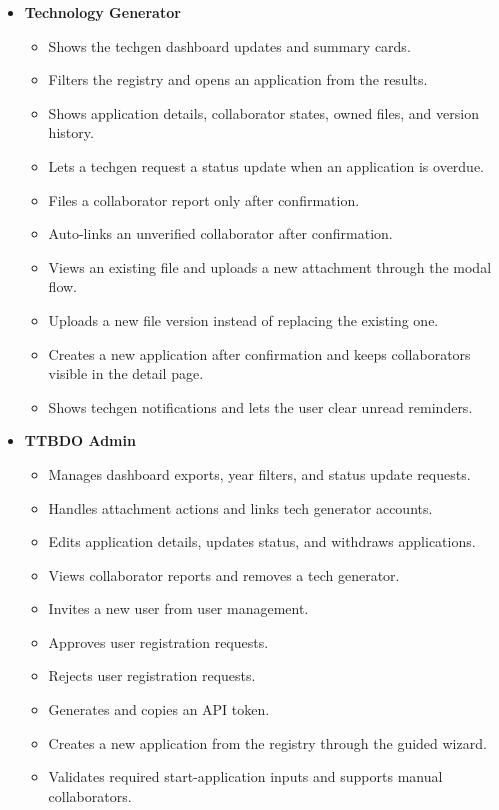 \begin{itemize}
    \item \textbf{Technology Generator}
    \begin{itemize}
        \item Shows the techgen dashboard updates and summary cards.
        \item Filters the registry and opens an application from the results.
        \item Shows application details, collaborator states, owned files, and version history.
        \item Lets a techgen request a status update when an application is overdue.
        \item Files a collaborator report only after confirmation.
        \item Auto-links an unverified collaborator after confirmation.
        \item Views an existing file and uploads a new attachment through the modal flow.
        \item Uploads a new file version instead of replacing the existing one.
        \item Creates a new application after confirmation and keeps collaborators visible in the detail page.
        \item Shows techgen notifications and lets the user clear unread reminders.
    \end{itemize}

    \item \textbf{TTBDO Admin}
    \begin{itemize}
        \item Manages dashboard exports, year filters, and status update requests.
        \item Handles attachment actions and links tech generator accounts.
        \item Edits application details, updates status, and withdraws applications.
        \item Views collaborator reports and removes a tech generator.
        \item Invites a new user from user management.
        \item Approves user registration requests.
        \item Rejects user registration requests.
        \item Generates and copies an API token.
        \item Creates a new application from the registry through the guided wizard.
        \item Validates required start-application inputs and supports manual collaborators.
    \end{itemize}


\end{itemize}
